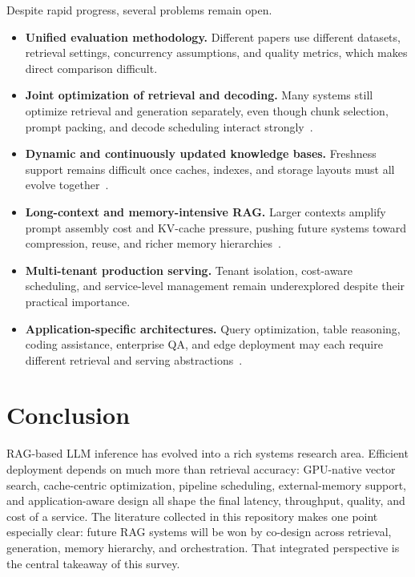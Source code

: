 \documentclass[acmsmall,screen]{acmart}
\begin{document}
Despite rapid progress, several problems remain open.
\begin{itemize}[leftmargin=*]
  \item \textbf{Unified evaluation methodology.} Different papers use different datasets, retrieval settings, concurrency assumptions, and quality metrics, which makes direct comparison difficult.
  \item \textbf{Joint optimization of retrieval and decoding.} Many systems still optimize retrieval and generation separately, even though chunk selection, prompt packing, and decode scheduling interact strongly~\cite{rago2025,hyperrag2025,patchwork2025}.
  \item \textbf{Dynamic and continuously updated knowledge bases.} Freshness support remains difficult once caches, indexes, and storage layouts must all evolve together~\cite{spfresh2023,edgerag2024,lsmvec2025}.
  \item \textbf{Long-context and memory-intensive RAG.} Larger contexts amplify prompt assembly cost and KV-cache pressure, pushing future systems toward compression, reuse, and richer memory hierarchies~\cite{memorag2025,chameleon2025}.
  \item \textbf{Multi-tenant production serving.} Tenant isolation, cost-aware scheduling, and service-level management remain underexplored despite their practical importance.
  \item \textbf{Application-specific architectures.} Query optimization, table reasoning, coding assistance, enterprise QA, and edge deployment may each require different retrieval and serving abstractions~\cite{sefrqo2026,aixelask2026,dgrag2025}.
\end{itemize}

\section{Conclusion}

RAG-based LLM inference has evolved into a rich systems research area. Efficient deployment depends on much more than retrieval accuracy: GPU-native vector search, cache-centric optimization, pipeline scheduling, external-memory support, and application-aware design all shape the final latency, throughput, quality, and cost of a service. The literature collected in this repository makes one point especially clear: future RAG systems will be won by co-design across retrieval, generation, memory hierarchy, and orchestration. That integrated perspective is the central takeaway of this survey.



\end{document}
